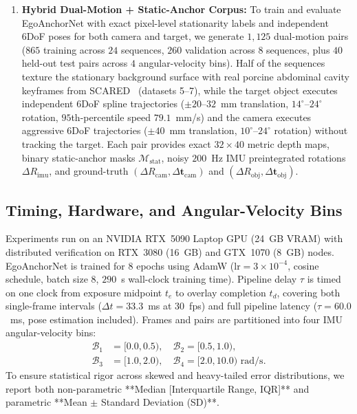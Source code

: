 \documentclass[journal]{IEEEtran}
\begin{document}
\begin{enumerate}
    \item \textbf{Hybrid Dual-Motion + Static-Anchor Corpus:} To train and evaluate EgoAnchorNet with exact pixel-level stationarity labels and independent 6DoF poses for both camera and target, we generate $1{,}125$ dual-motion pairs ($865$ training across $24$ sequences, $260$ validation across $8$ sequences, plus $40$ held-out test pairs across $4$ angular-velocity bins). Half of the sequences texture the stationary background surface with real porcine abdominal cavity keyframes from SCARED~\cite{allan2021scared} (datasets 5--7), while the target object executes independent 6DoF spline trajectories ($\pm 20\text{--}32$~mm translation, $14^\circ\text{--}24^\circ$ rotation, $95$th-percentile speed $79.1$~mm/s) and the camera executes aggressive 6DoF trajectories ($\pm 40$~mm translation, $10^\circ\text{--}24^\circ$ rotation) without tracking the target. Each pair provides exact $32\times 40$ metric depth maps, binary static-anchor masks $\mathcal{M}_{\text{stat}}$, noisy $200$~Hz IMU preintegrated rotations $\Delta R_{\text{imu}}$, and ground-truth $(\Delta R_{\text{cam}}, \Delta\mathbf{t}_{\text{cam}})$ and $(\Delta R_{\text{obj}}, \Delta\mathbf{t}_{\text{obj}})$.
\end{enumerate}

\subsection{Timing, Hardware, and Angular-Velocity Bins}
Experiments run on an NVIDIA RTX~5090 Laptop GPU (24~GB VRAM) with distributed verification on RTX~3080 (16~GB) and GTX~1070 (8~GB) nodes. EgoAnchorNet is trained for $8$ epochs using AdamW ($\text{lr}=3\times 10^{-4}$, cosine schedule, batch size $8$, $290$~s wall-clock training time). Pipeline delay $\tau$ is timed on one clock from exposure midpoint $t_e$ to overlay completion $t_d$, covering both single-frame intervals ($\Delta t = 33.3$~ms at $30$~fps) and full pipeline latency ($\tau = 60.0$~ms, pose estimation included). Frames and pairs are partitioned into four IMU angular-velocity bins:
\begin{align*}
\mathcal{B}_1 &= [0.0,0.5),\quad \mathcal{B}_2 = [0.5,1.0),\\
\mathcal{B}_3 &= [1.0,2.0),\quad \mathcal{B}_4 = [2.0,10.0)\text{~rad/s}.
\end{align*}
To ensure statistical rigor across skewed and heavy-tailed error distributions, we report both non-parametric **Median [Interquartile Range, IQR]** and parametric **Mean $\pm$ Standard Deviation (SD)**.
\end{document}
